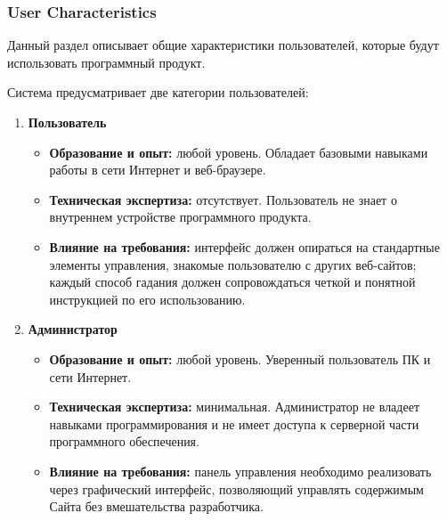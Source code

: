 \subsubsection{User Characteristics}

Данный раздел описывает общие характеристики пользователей, которые будут использовать программный продукт.

Система предусматривает две категории пользователей:

\begin{enumerate}
    \item \textbf{Пользователь}
    \begin{itemize}
        \item \textbf{Образование и опыт:} любой уровень. Обладает базовыми навыками работы в сети Интернет и веб-браузере.
        \item \textbf{Техническая экспертиза:} отсутствует. Пользователь не знает о внутреннем устройстве программного продукта.
        \item \textbf{Влияние на требования:} интерфейс должен опираться на стандартные элементы управления, знакомые пользователю с других веб-сайтов; каждый способ гадания должен сопровождаться четкой и понятной инструкцией по его использованию.
    \end{itemize}
    \item \textbf{Администратор}
    \begin{itemize}
        \item \textbf{Образование и опыт:} любой уровень. Уверенный пользователь ПК и сети Интернет.
        \item \textbf{Техническая экспертиза:} минимальная. Администратор не владеет навыками программирования и не имеет доступа к серверной части программного обеспечения.
        \item \textbf{Влияние на требования:} панель управления необходимо реализовать через графический интерфейс, позволяющий управлять содержимым Сайта без вмешательства разработчика.
    \end{itemize}
\end{enumerate}